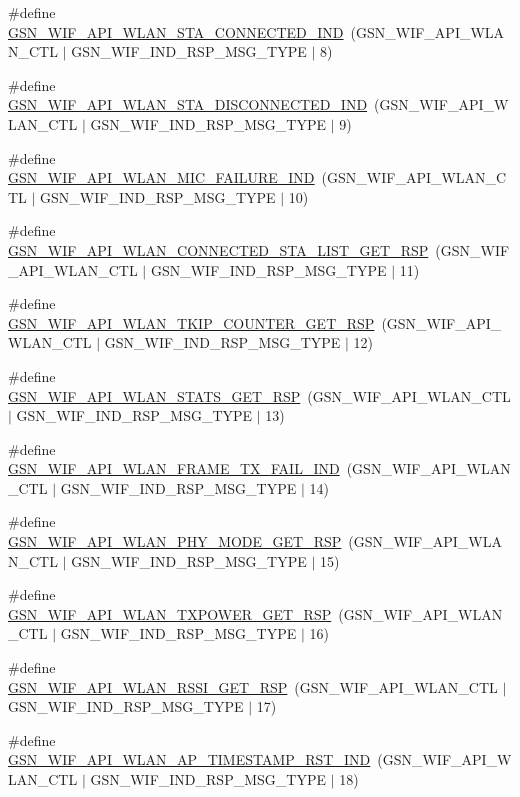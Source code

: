 \begin{DoxyCompactItemize}
\item 
\#define \hyperlink{a00606_a80cd149f4f96b359f53dbdfd943431c9}{GSN\_\-WIF\_\-API\_\-WLAN\_\-STA\_\-CONNECTED\_\-IND}~(GSN\_\-WIF\_\-API\_\-WLAN\_\-CTL $|$ GSN\_\-WIF\_\-IND\_\-RSP\_\-MSG\_\-TYPE $|$ 8)
\item 
\#define \hyperlink{a00606_aa2a74f308fee600db82ab1ae2079975b}{GSN\_\-WIF\_\-API\_\-WLAN\_\-STA\_\-DISCONNECTED\_\-IND}~(GSN\_\-WIF\_\-API\_\-WLAN\_\-CTL $|$ GSN\_\-WIF\_\-IND\_\-RSP\_\-MSG\_\-TYPE $|$ 9)
\item 
\#define \hyperlink{a00606_aa9c3f26b1df9c3628d11fd1c9be77617}{GSN\_\-WIF\_\-API\_\-WLAN\_\-MIC\_\-FAILURE\_\-IND}~(GSN\_\-WIF\_\-API\_\-WLAN\_\-CTL $|$ GSN\_\-WIF\_\-IND\_\-RSP\_\-MSG\_\-TYPE $|$ 10)
\item 
\#define \hyperlink{a00606_af666ac0238396dacb1d840f30722e0e0}{GSN\_\-WIF\_\-API\_\-WLAN\_\-CONNECTED\_\-STA\_\-LIST\_\-GET\_\-RSP}~(GSN\_\-WIF\_\-API\_\-WLAN\_\-CTL $|$ GSN\_\-WIF\_\-IND\_\-RSP\_\-MSG\_\-TYPE $|$ 11)
\item 
\#define \hyperlink{a00606_a2badca9f3116f476a7c0a4e70540ddda}{GSN\_\-WIF\_\-API\_\-WLAN\_\-TKIP\_\-COUNTER\_\-GET\_\-RSP}~(GSN\_\-WIF\_\-API\_\-WLAN\_\-CTL $|$ GSN\_\-WIF\_\-IND\_\-RSP\_\-MSG\_\-TYPE $|$ 12)
\item 
\#define \hyperlink{a00606_a5d9598cf8c8aacd7bd4887f177b6ab47}{GSN\_\-WIF\_\-API\_\-WLAN\_\-STATS\_\-GET\_\-RSP}~(GSN\_\-WIF\_\-API\_\-WLAN\_\-CTL $|$ GSN\_\-WIF\_\-IND\_\-RSP\_\-MSG\_\-TYPE $|$ 13)
\item 
\#define \hyperlink{a00606_a9853dd8e3717d38a6e418711af6ca64b}{GSN\_\-WIF\_\-API\_\-WLAN\_\-FRAME\_\-TX\_\-FAIL\_\-IND}~(GSN\_\-WIF\_\-API\_\-WLAN\_\-CTL $|$ GSN\_\-WIF\_\-IND\_\-RSP\_\-MSG\_\-TYPE $|$ 14)
\item 
\#define \hyperlink{a00606_a9c7f8ddfa90f9193ba9e4687e49849f8}{GSN\_\-WIF\_\-API\_\-WLAN\_\-PHY\_\-MODE\_\-GET\_\-RSP}~(GSN\_\-WIF\_\-API\_\-WLAN\_\-CTL $|$ GSN\_\-WIF\_\-IND\_\-RSP\_\-MSG\_\-TYPE $|$ 15)
\item 
\#define \hyperlink{a00606_a96cdab55830b9edbe1cc69eaa85dc825}{GSN\_\-WIF\_\-API\_\-WLAN\_\-TXPOWER\_\-GET\_\-RSP}~(GSN\_\-WIF\_\-API\_\-WLAN\_\-CTL $|$ GSN\_\-WIF\_\-IND\_\-RSP\_\-MSG\_\-TYPE $|$ 16)
\item 
\#define \hyperlink{a00606_a269e0a872acf675df2554005aed594c3}{GSN\_\-WIF\_\-API\_\-WLAN\_\-RSSI\_\-GET\_\-RSP}~(GSN\_\-WIF\_\-API\_\-WLAN\_\-CTL $|$ GSN\_\-WIF\_\-IND\_\-RSP\_\-MSG\_\-TYPE $|$ 17)
\item 
\#define \hyperlink{a00606_ae8ecda1d37b7e28222baad4442fcbdcb}{GSN\_\-WIF\_\-API\_\-WLAN\_\-AP\_\-TIMESTAMP\_\-RST\_\-IND}~(GSN\_\-WIF\_\-API\_\-WLAN\_\-CTL $|$ GSN\_\-WIF\_\-IND\_\-RSP\_\-MSG\_\-TYPE $|$ 18)

\end{DoxyCompactItemize}
